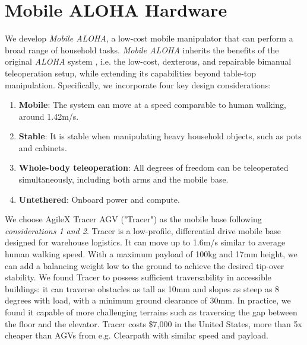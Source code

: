 \documentclass[11pt, a4paper, logo, twocolumn]{stanford}
\newcommand{\method}{\textit{Mobile ALOHA} }
\newcommand{\methodcomma}{\textit{Mobile ALOHA}}
\newcommand{\aloha}{\textit{ALOHA} }
\begin{document}
\section{Mobile ALOHA Hardware}
We develop \methodcomma, a low-cost mobile manipulator that can perform a broad range of household tasks.
\method inherits the benefits of the original \aloha system \cite{zhao2023learning}, i.e. the low-cost, dexterous, and repairable bimanual teleoperation setup, while extending its capabilities beyond table-top manipulation.
Specifically, we incorporate four key design considerations:

\begin{enumerate}
\item \textbf{Mobile}: The system can move at a speed comparable to human walking, around 1.42m/s.
\item \textbf{Stable}: It is stable when manipulating heavy household objects, such as pots and cabinets.
\item \textbf{Whole-body teleoperation}: All degrees of freedom can be teleoperated simultaneously, including both arms and the mobile base.
\item \textbf{Untethered}: Onboard power and compute.
\end{enumerate}


We choose AgileX Tracer AGV ("Tracer") as the mobile base following \textit{considerations 1 and 2}. Tracer is a low-profile, differential drive mobile base designed for warehouse logistics. It can move up to 1.6m/s similar to average human walking speed. With a maximum payload of 100kg and 17mm height, we can add a balancing weight low to the ground to achieve the desired tip-over stability.
We found Tracer to possess sufficient traversability in accessible buildings: it can traverse obstacles as tall as 10mm and slopes as steep as 8 degrees with load, with a minimum ground clearance of 30mm. In practice, we found it capable of more challenging terrains such as traversing the gap between the floor and the elevator.
Tracer costs \$7,000 in the United States, more than 5x cheaper than AGVs from e.g. Clearpath with similar speed and payload.
\end{document}
